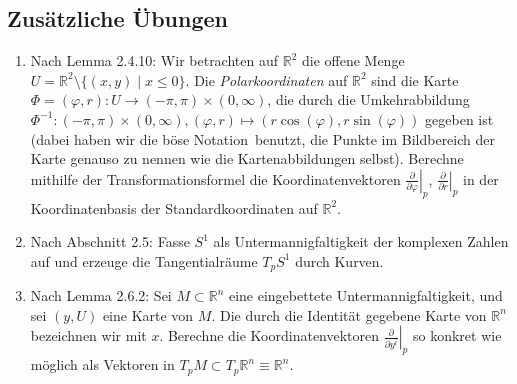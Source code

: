 \documentclass[a4paper]{scrartcl}
\newcommand{\R}{\mathbb{R}}
\begin{document}
	\subsection{Zusätzliche Übungen}
	\begin{enumerate}
		\item Nach Lemma 2.4.10:
			Wir betrachten auf $\R^2$ die offene Menge $U = \R^2 \setminus\{(x,y) \mid x \le 0\}$. Die \emph{Polarkoordinaten} auf $\R^2$ sind die Karte $\Phi = (\varphi,r) \colon U \to (-\pi,\pi) \times (0,\infty)$, die durch die Umkehrabbildung $\Phi^{-1}\colon (-\pi,\pi)\times(0,\infty), (\varphi,r) \mapsto (r\cos(\varphi), r\sin(\varphi))$ gegeben ist (dabei haben wir die \glqq böse Notation\grqq\ benutzt, die Punkte im Bildbereich der Karte genauso zu nennen wie die Kartenabbildungen selbst). Berechne mithilfe der Transformationsformel die Koordinatenvektoren $\left.\frac{\partial}{\partial\varphi}\right|_p$, $\left.\frac{\partial}{\partial r}\right|_p$ in der Koordinatenbasis der Standardkoordinaten auf $\R^2$.
		\item Nach Abschnitt 2.5:
			Fasse $S^1$ als Untermannigfaltigkeit der komplexen Zahlen auf und erzeuge die Tangentialräume $T_pS^1$ durch Kurven.
		\item Nach Lemma 2.6.2:
			Sei $M \subset \R^n$ eine eingebettete Untermannigfaltigkeit, und sei $(y,U)$ eine Karte von $M$. Die durch die Identität gegebene Karte von $\R^n$ bezeichnen wir mit $x$. Berechne die Koordinatenvektoren $\left.\frac{\partial}{\partial y^i}\right|_p$ so konkret wie möglich als Vektoren in $T_pM \subset T_p\R^n \equiv \R^n$.
	\end{enumerate}
\end{document}
